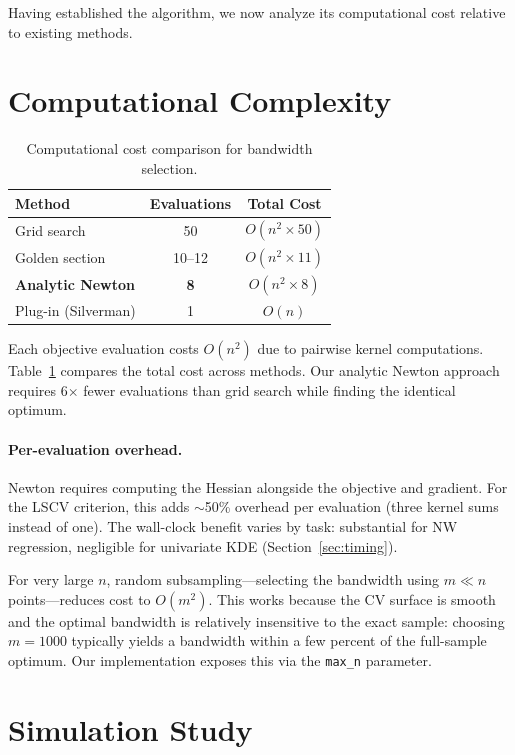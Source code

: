 \documentclass[11pt]{article}
\theoremstyle{definition}
\theoremstyle{remark}
\begin{document}
Having established the algorithm, we now analyze its computational cost relative to existing methods.

\section{Computational Complexity}
\label{sec:complexity}

\begin{table}[t]
\centering
\caption{Computational cost comparison for bandwidth selection.}
\label{tab:complexity}
\begin{tabular}{lcc}
\toprule
Method & Evaluations & Total Cost \\
\midrule
Grid search & 50 & $O(n^2 \times 50)$ \\
Golden section & 10--12 & $O(n^2 \times 11)$ \\
\textbf{Analytic Newton} & \textbf{8} & $O(n^2 \times 8)$ \\
Plug-in (Silverman) & 1 & $O(n)$ \\
\bottomrule
\end{tabular}
\end{table}

Each objective evaluation costs $O(n^2)$ due to pairwise kernel computations.
Table~\ref{tab:complexity} compares the total cost across methods.
Our analytic Newton approach requires 6$\times$ fewer evaluations than grid search while finding the identical optimum.

\paragraph{Per-evaluation overhead.}
Newton requires computing the Hessian alongside the objective and gradient.
For the LSCV criterion, this adds $\sim$50\% overhead per evaluation (three kernel sums instead of one).
The wall-clock benefit varies by task: substantial for NW regression, negligible for univariate KDE (Section~\ref{sec:timing}).

For very large $n$, random subsampling---selecting the bandwidth using $m \ll n$ points---reduces cost to $O(m^2)$.
This works because the CV surface is smooth and the optimal bandwidth is relatively insensitive to the exact sample: choosing $m = 1000$ typically yields a bandwidth within a few percent of the full-sample optimum.
Our implementation exposes this via the \texttt{max\_n} parameter.

\section{Simulation Study}
\label{sec:simulations}
\end{document}
